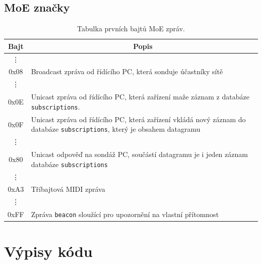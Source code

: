\section{\acs{MoE} značky}\label{chpt:MoEZnacky}
\begin{table}[h!]
	\centering
	\caption{Tabulka prvních bajtů \acs{MoE} zpráv.}
	\begin{tabular}{|  >{\ttfamily} c | p{} |}
		\hline
		\textnormal{Bajt} & \multicolumn{1}{|c|}{Popis} \\
		\hline \hline
		\vdots & \\
		
		0x08 & Broadcast zpráva od řídícího PC, která sonduje účastníky sítě \\
		
		\vdots & \\

		0x0E & Unicast zpráva od řídícího  PC, která zařízení maže záznam z databáze \texttt{subscriptions}. \\
		
		0x0F & Unicast zpráva od řídícího PC, která zařízení vkládá nový záznam do databáze \texttt{subscriptions}, který je obsahem datagramu \\
		
		\vdots & \\
		
		0x80 & Unicast odpověď na sondáž PC, součástí datagramu je i jeden záznam databáze \texttt{subscriptions} \\

		\vdots & \\

		0xA3 & Tříbajtová \acs{MIDI} zpráva \\
		
		\vdots & \\
		
		0xFF & Zpráva \texttt{beacon} sloužící pro upozornění na vlastní přítomnost \\
		\hline
	\end{tabular}
\end{table}


\chapter{Výpisy kódu}
